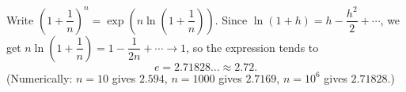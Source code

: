 Write $\left(1+\dfrac{1}{n}\right)^n=\exp\left(n\ln\left(1+\dfrac{1}{n}\right)\right)$. Since $\ln(1+h)=h-\dfrac{h^2}{2}+\cdots$, we get $n\ln\left(1+\dfrac{1}{n}\right)=1-\dfrac{1}{2n}+\cdots\to1$, so the expression tends to
\[
e=2.71828\ldots\approx\boxed{2.72}.
\]
(Numerically: $n=10$ gives $2.594$, $n=1000$ gives $2.7169$, $n=10^6$ gives $2.71828$.)
